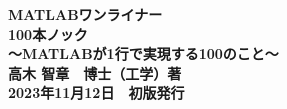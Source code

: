 \documentclass[b5paper,dvipdfmx,tombo,openany,papersize]{jsbook}
\begin{document}
\begin{center} %
	\thispagestyle{empty}
	\vspace*{20mm}
	\textbf{\Huge MATLABワンライナー\\100本ノック} \\\vspace{10mm}
	\textbf{\LARGE ～MATLABが1行で実現する100のこと～} \\\vspace{100mm}
	\textbf{\Large 高木 智章　博士（工学）著} \\\vspace{20mm}
	\textbf{\Large 2023年11月12日　初版発行}
\end{center}


\end{document}
